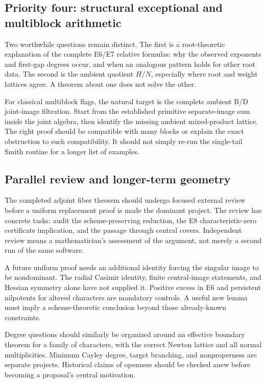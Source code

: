 \subsection{Priority four: structural exceptional and multiblock arithmetic}
Two worthwhile questions remain distinct. The first is a root-theoretic explanation of the complete E6/E7 relative formulas: why the observed exponents and first-gap degrees occur, and when an analogous pattern holds for other root data. The second is the ambient quotient $H/N$, especially where root and weight lattices agree. A theorem about one does not solve the other.

For classical multiblock flags, the natural target is the complete ambient B/D joint-image filtration. Start from the established primitive separate-image sum inside the joint algebra, then identify the missing ambient mixed-product lattice. The right proof should be compatible with many blocks or explain the exact obstruction to such compatibility. It should not simply re-run the single-tail Smith routine for a longer list of examples.

\subsection{Parallel review and longer-term geometry}
The completed adjoint fiber theorem should undergo focused external review before a uniform replacement proof is made the dominant project. The review has concrete tasks: audit the scheme-preserving reduction, the E8 characteristic-zero certificate implication, and the passage through central covers. Independent review means a mathematician's assessment of the argument, not merely a second run of the same software.

A future uniform proof needs an additional identity forcing the singular image to be nondominant. The radial Casimir identity, finite central-image statements, and Hessian symmetry alone have not supplied it. Positive excess in E6 and persistent nilpotents for altered characters are mandatory controls. A useful new lemma must imply a scheme-theoretic conclusion beyond those already-known constraints.

Degree questions should similarly be organized around an effective boundary theorem for a family of characters, with the correct Newton lattice and all normal multiplicities. Minimum Cayley degree, target branching, and nonproperness are separate projects. Historical claims of openness should be checked anew before becoming a proposal's central motivation.

